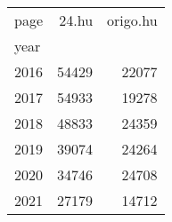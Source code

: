 \begin{tabular}{lrr}
\toprule
page &  24.hu &  origo.hu \\
year &        &           \\
\midrule
2016 &  54429 &     22077 \\
2017 &  54933 &     19278 \\
2018 &  48833 &     24359 \\
2019 &  39074 &     24264 \\
2020 &  34746 &     24708 \\
2021 &  27179 &     14712 \\
\bottomrule
\end{tabular}
